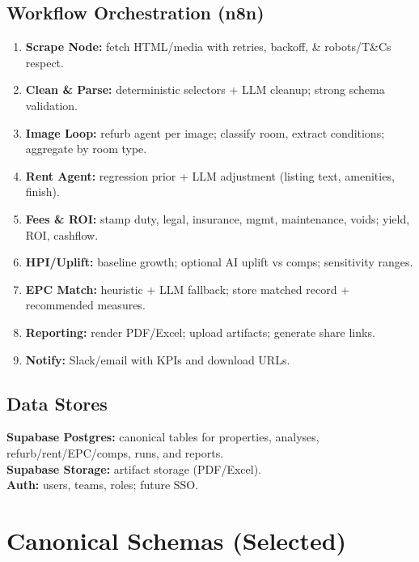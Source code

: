 \documentclass[12pt,a4paper]{article}
\begin{document}
\subsection{Workflow Orchestration (n8n)}
\begin{enumerate}[leftmargin=1.5em]
  \item \textbf{Scrape Node:} fetch HTML/media with retries, backoff, \& robots/T\&Cs respect.
  \item \textbf{Clean \& Parse:} deterministic selectors + LLM cleanup; strong schema validation.
  \item \textbf{Image Loop:} refurb agent per image; classify room, extract conditions; aggregate by room type.
  \item \textbf{Rent Agent:} regression prior + LLM adjustment (listing text, amenities, finish).
  \item \textbf{Fees \& ROI:} stamp duty, legal, insurance, mgmt, maintenance, voids; yield, ROI, cashflow.
  \item \textbf{HPI/Uplift:} baseline growth; optional AI uplift vs comps; sensitivity ranges.
  \item \textbf{EPC Match:} heuristic + LLM fallback; store matched record + recommended measures.
  \item \textbf{Reporting:} render PDF/Excel; upload artifacts; generate share links.
  \item \textbf{Notify:} Slack/email with KPIs and download URLs.
\end{enumerate}

\subsection{Data Stores}
\textbf{Supabase Postgres:} canonical tables for properties, analyses, refurb/rent/EPC/comps, runs, and reports. \\
\textbf{Supabase Storage:} artifact storage (PDF/Excel). \\
\textbf{Auth:} users, teams, roles; future SSO.

\section{Canonical Schemas (Selected)}
\end{document}
